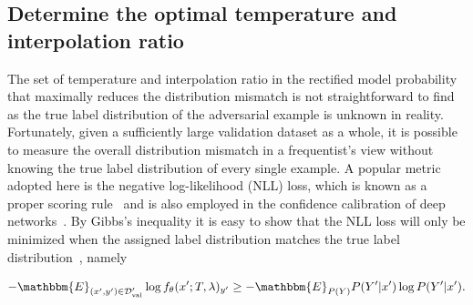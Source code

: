 
\subsection{Determine the optimal temperature and interpolation ratio}




The set of temperature and interpolation ratio in the rectified model probability that maximally reduces the distribution mismatch is not straightforward to find 
as the true label distribution of the adversarial example is unknown in reality. Fortunately, given a sufficiently large validation dataset as a whole, it is possible to measure the overall distribution mismatch in a frequentist's view without knowing the true label distribution of every single example. A popular metric adopted here is the negative log-likelihood (NLL) loss, which is known as a proper scoring rule~\citep{Gneiting2007StrictlyPS} and is also employed in the confidence calibration of deep networks~\citep{Guo2017OnCO}. By Gibbs's inequality it is easy to show that the NLL loss will only be minimized when the assigned label distribution matches the true label distribution~\citep{Hastie2001TheEO}, namely


\begin{equation}
- \mathbbm{E}_{(x', y')\in \mathcal{D}'_\text{val}} \log f_\theta(x'; T, \lambda)_{y'}
\ge - \mathbbm{E}_{P(Y)} P(Y'|x') \log P(Y'|x').
\end{equation}





